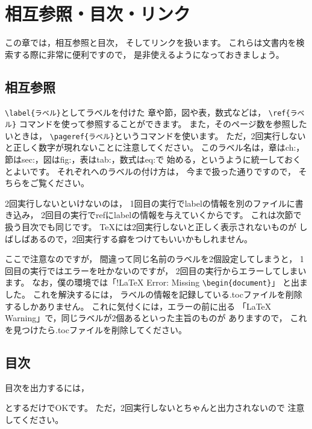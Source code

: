 \documentclass[class=jreport, crop=false, preview=false, dvipdfmx, fleqn]{standalone}
\begin{document}
\chapter{相互参照・目次・リンク}
\label{ch:references-contents-link}

この章では，相互参照と目次，
そしてリンクを扱います。
これらは文書内を検索する際に非常に便利ですので，
是非使えるようになっておきましょう。



\section{相互参照}
\label{sec:references}

\verb|\label{ラベル}|としてラベルを付けた
章や節，図や表，数式などは，
\verb|\ref{ラベル}| コマンドを使って参照することができます。
また，そのページ数を参照したいときは，
\verb|\pageref{ラベル}|というコマンドを使います。
ただ，2回実行しないと正しく数字が現れないことに注意してください。
このラベル名は，章はch:，節はsec:，図はfig:，表はtab:，数式はeq:で
始める，というように統一しておくとよいです。
それぞれへのラベルの付け方は，
今まで扱った通りですので，
そちらをご覧ください。

2回実行しないといけないのは，
1回目の実行でlabelの情報を別のファイルに書き込み，
2回目の実行でrefにlabelの情報を与えていくからです。
これは次節で扱う目次でも同じです。
{\TeX}には2回実行しないと正しく表示されないものが
しばしばあるので，2回実行する癖をつけてもいいかもしれません。

ここで注意なのですが，
間違って同じ名前のラベルを2個設定してしまうと，
1回目の実行ではエラーを吐かないのですが，
2回目の実行からエラーしてしまいます。
なお，僕の環境では「!LaTeX Error: Missing \verb|\begin{document}|」
と出ました。
これを解決するには，
ラベルの情報を記録している.tocファイルを削除するしかありません。
これに気付くには，エラーの前に出る
「LaTeX Warning」で，同じラベルが2個あるといった主旨のものが
ありますので，
これを見つけたら.tocファイルを削除してください。



\section{目次}
目次を出力するには，
\begin{ITeX}
\tableofcontents
\end{ITeX}
とするだけでOKです。
ただ，2回実行しないとちゃんと出力されないので
注意してください。
\end{document}

